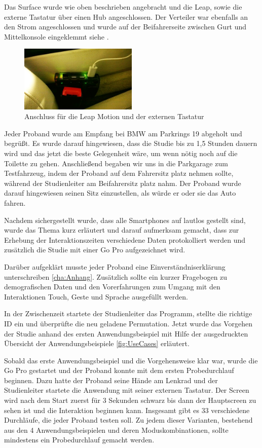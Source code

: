 Das Surface wurde wie oben beschrieben angebracht und die Leap, sowie die externe Tastatur über einen Hub angeschlossen. 
Der Verteiler war ebenfalls an den Strom angeschlossen und wurde auf der Beifahrerseite zwischen Gurt und Mittelkonsole eingeklemmt siehe . 
\begin{figure}[ht]
  \centering
  \includegraphics[width=0.5\textwidth]{img/Hub.jpg}
  \caption{Anschluss für die Leap Motion und der externen Tastatur}
  \label{fig:Hub}
\end{figure} 

Jeder Proband wurde am Empfang bei BMW am Parkrings 19 abgeholt und begrüßt.
Es wurde darauf hingewiesen, dass die Studie bis zu 1,5 Stunden dauern wird und das jetzt die beste Gelegenheit wäre, um wenn nötig noch auf die Toilette zu gehen.
Anschließend begaben wir uns in die Parkgarage zum Testfahrzeug, indem der Proband auf dem Fahrersitz platz nehmen sollte, während der Studienleiter am Beifahrersitz platz nahm.
Der Proband wurde darauf hingewiesen seinen Sitz einzustellen, als würde er oder sie das Auto fahren.

Nachdem sichergestellt wurde, dass alle Smartphones auf lautlos gestellt sind, wurde das Thema kurz erläutert und darauf aufmerksam gemacht, dass zur Erhebung der Interaktionszeiten verschiedene Daten protokolliert werden und zusätzlich die Studie mit einer Go Pro aufgezeichnet wird.

Darüber aufgeklärt musste jeder Proband eine Einverständniserklärung unterschreiben \ref{cha:Anhang}.
Zusätzlich sollte ein kurzer Fragebogen zu demografischen Daten und den Vorerfahrungen zum Umgang mit den Interaktionen Touch, Geste und Sprache ausgefüllt werden.

In der Zwischenzeit startete der Studienleiter das Programm, stellte die richtige ID ein und überprüfte die neu geladene Permutation.
Jetzt wurde das Vorgehen der Studie anhand des ersten Anwendungsbeispiel mit Hilfe der ausgedruckten Übersicht der Anwendungsbeispiele \ref{fig:UseCases} erläutert.

Sobald das erste Anwendungsbeispiel und die Vorgehensweise klar war, wurde die Go Pro gestartet und der Proband konnte mit dem ersten Probedurchlauf beginnen. Dazu hatte der Proband seine Hände am Lenkrad und der Studienleiter startete die Anwendung mit seiner externen Tastatur. 
Der Screen wird nach dem Start zuerst für 3 Sekunden schwarz bis dann der Hauptscreen zu sehen ist und die Interaktion beginnen kann.
Insgesamt gibt es 33 verschiedene Durchläufe, die jeder Proband testen soll.
Zu jedem dieser Varianten, bestehend aus den 4 Anwendungsbeispielen und deren Moduskombinationen, sollte mindestens ein Probedurchlauf gemacht werden.

